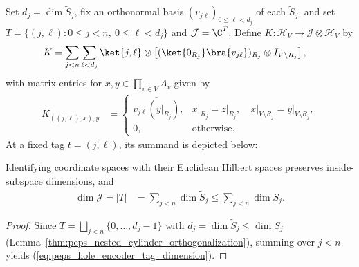 \begin{definition}
    \label{def:peps_hole_encoder}
    \leanok
    Set $d_j=\dim\widetilde S_j$, fix an orthonormal basis
    $(v_{j\ell})_{0\leq\ell<d_j}$ of each $\widetilde S_j$, and set
    $T=\{(j,\ell):0\leq j<n,\ 0\leq\ell<d_j\}$ and $\mathcal J=\C^T$. Define
    $K\colon\mathcal H_V\to\mathcal J\otimes\mathcal H_V$ by
    \begin{align}
        K & =\sum_{j<n}\sum_{\ell<d_j}\ket{j,\ell}\otimes
        \left[(\ket{0_{R_j}}\bra{v_{j\ell}})_{R_j}
            \otimes I_{V\setminus R_j}\right],
        \label{eq:peps_hole_encoder}
    \end{align}
    with matrix entries for $x,y\in\prod_{v\in V}A_v$ given by
    \begin{align}
        K_{((j,\ell),x),y}
        \label{eq:peps_hole_encoder_coefficient}
         & =
        \begin{cases}
            \overline{v_{j\ell}(y\vert_{R_j})},
               & x\vert_{R_j}=z\vert_{R_j},\quad
            x\vert_{V\setminus R_j}=y\vert_{V\setminus R_j}, \\
            0, & \text{otherwise}.
        \end{cases}
    \end{align}
    At a fixed tag $t=(j,\ell)$, its summand is depicted below:
    
\end{definition}

\begin{lemma}
    \label{thm:peps_hole_encoder_tag_dimension}
    \leanok
    Identifying coordinate spaces with their Euclidean Hilbert spaces preserves
    inside-subspace dimensions, and
    \begin{align}
        \dim\mathcal J=|T|
         & =\sum_{j<n}\dim\widetilde S_j
        \leq\sum_{j<n}\dim S_j.
        \label{eq:peps_hole_encoder_tag_dimension}
    \end{align}
\end{lemma}
\begin{proof}
    \leanok
    Since $T=\bigsqcup_{j<n}\{0,\dots,d_j-1\}$ with $d_j=\dim\widetilde S_j\leq\dim S_j$
    (Lemma~\ref{thm:peps_nested_cylinder_orthogonalization}), summing over
    $j<n$ yields (\ref{eq:peps_hole_encoder_tag_dimension}).
\end{proof}


